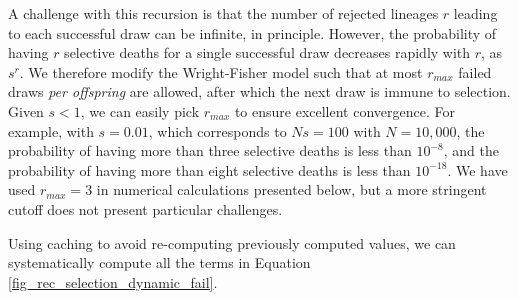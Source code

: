 \documentclass[review,nonatbib]{elsarticle}
\newcommand{\dslash}{/\!\!/}
\newcommand{\Coalc}[4]{\begin{bmatrix}#1\dslash #2 \\ #3\dslash #4 \end{bmatrix}}
\begin{document}


A challenge with this recursion is that the number of rejected lineages $r$ leading to each successful
draw can be infinite, in principle.
 However, the probability of having $r$ selective deaths for a single successful draw decreases
rapidly with $r$, as $s^r.$ We therefore modify the Wright-Fisher model such that at most $r_{max}$ failed
draws \emph{per offspring} are allowed, after which the next draw is immune to selection. Given
$s<1$, we can easily pick $r_{max}$ to ensure excellent convergence. For example, with $s=0.01$,
which corresponds to $Ns=100$ with $N=10,000$, the probability of having more than
three selective deaths is less than $10^{-8}$, and the probability of having more than eight selective deaths is
less than $10^{-18}.$ We have used $r_{max}=3$ in numerical calculations presented below, but a 
more stringent cutoff does not present particular challenges.

Using caching to avoid re-computing previously computed values, we can systematically compute all the terms in Equation
\ref{fig_rec_selection_dynamic_fail}.
\end{document}
